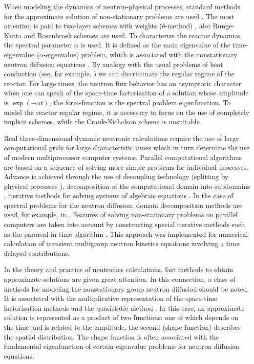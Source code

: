 \documentclass[authoryear]{elsarticle}
\begin{document}
When modeling the dynamics of neutron-physical processes, standard methods for the approximate solution of non-stationary problems are used  \citep{sutton1996diffusion,cho2005fundamentals,stacey}. The most attention is paid to two-layer schemes with weights ($\theta$-method) \citep{Ascher2008,LeVeque2007,HundsdorferVerwer2003},
also Runge-Kutta and Rosenbroek schemes \citep{Butcher2008,HairerWanner2010}are used. To characterize the reactor dynamics, the spectral parameter  $\alpha$ is used. It is defined as the main eigenvalue of the time-eigenvalue  ($\alpha$-eigenvalue) problem, which is associated with the nonstationary neutron diffusion equations 
\citep{Bell1970,modak2007scheme,verdu20103d}.
By analogy with the usual problems of heat conduction (see, for example,  \cite{luikov2012analytical,samarskii1996computational}) we can discriminate the regular regime of the reactor. For large times, the neutron flux behavior has an asymptotic character when one can speak of the space-time factorization of a solution whose amplitude is $\exp(-\alpha t)$, the form-function is the spectral problem eigenfunction. To model the reactor regular regime, it is necessary to focus on the use of completely implicit schemes, while the Crank-Nicholson scheme is unsuitable  \citep{nd-mm}.

Real three-dimensional dynamic neutronic calculations require the use of large computational grids for large characteristic times which in turn determine the  use of modern multiprocessor computer systems. Parallel computational algorithms are based on a sequence of solving more simple problems for individual processes. Advance is achieved through the use of decoupling technology (splitting by physical processes 
\citep{Vabishchevich2014}), decomposition of the computational domain into subdomains  \citep{ToselliWidlund2005},
iterative methods for solving systems of algebraic equations  \citep{Saad2003}. 
In the case of spectral problems for the neutron diffusion, domain decomposition methods are used, for example, in  \cite{guerin2010domain}. 
Features of solving non-stationary problems on parallel computers are taken into account by constructing special iterative methods such as the parareal in time algorithm  \citep{maday2005parareal}. 
This approach was implemented \cite{baudron2014parareal} for numerical calculation of transient multigroup neutron kinetics equations involving a time delayed contributions.

In the theory and practice of neutronics calculations, fast methods to obtain approximate solutions are given great attention. In this connection, a class of methods for modeling the nonstationary group neutron diffusion should be noted. It is associated with the multiplicative representation of the space-time factorization methods and the quasistatic method  \citep{dodds1976accuracy,chou1990three,goluoglu2001time,dulla2008quasi,dahmani20013d}.
In this case, an approximate solution is represented as a product of two functions: one of which depends on the time and is related to the amplitude, the second (shape function) describes the spatial distribution. The shape function is often associated with the fundamental eigenfunction of certain eigenvalue problems for neutron diffusion equations. 
\end{document}
